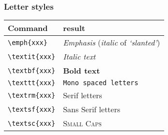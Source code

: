 \documentclass[aspectratio=169]{beamer}
\begin{document}
\begin{frame}[fragile]
 \frametitle{Letter styles}

 \begin{center}
   \begin{tabular}{ll}
     \toprule
     Command & result \\
     \midrule
     \verb?\emph{xxx}?   & \emph{Emphasis} (\textrm{\emph{italic}} of \textsf{\emph{`slanted'}})\\
     \verb?\textit{xxx}? & \textit{Italic text} \\
     \verb?\textbf{xxx}? & \textbf{Bold text} \\
     \verb?\texttt{xxx}? & \texttt{Mono spaced letters} \\
     \verb?\textrm{xxx}? & \textrm{Serif letters}  \\
     \verb?\textsf{xxx}? & \textsf{Sans Serif letters}  \\
     \verb?\textsc{xxx}? & \textsc{Small Caps} \\
   \end{tabular}
 \end{center}

\end{frame}
\end{document}
